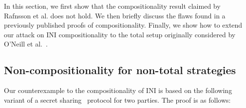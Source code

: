\documentclass[preprint,5p,twocolumn]{elsarticle}
\begin{document}
\label{sec:non-compositionality}

In this section, we first show that the compositionality result claimed by Rafnsson et al.
 does not hold. We then briefly discuss the flaws found in a previously published proofs
 of compositionality. Finally, we show how to extend our attack on INI compositionality
 to the total setup originally considered by O'Neill et
al.~\cite{ONeill2006}.

\subsection{Non-compositionality for non-total strategies}

Our counterexample to the compositionality of INI is based on the following variant of a secret sharing~\cite{Shamir1979} protocol
for two parties. The proof is as follows:
\end{document}
